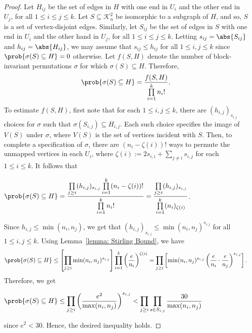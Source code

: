 \documentclass[12pt]{article}
\begin{document}
\begin{proof}
Let $H_{ij}$ be the set of edges in $H$ with one end in $U_i$ and the other end in $U_j$, for all $1\le i\le j\le k$.  Let $S\subseteq\mathcal{K}_n^2$ be isomorphic to a subgraph of $H$, and so, $S$ is a set of vertex-disjoint edges. Similarly, let $S_{ij}$ be the set of edges in $S$ with one end in $U_i$ and the other hand in $U_j$, for all $1\le i\le j\le k$. Letting $s_{ij} = \abs{S_{ij}}$ and $h_{ij} = \abs{H_{ij}}$, we may assume that $s_{ij}\leq h_{ij}$ for all $1\leq i,j\leq k$ since $\prob{\sigma(S)\subseteq H} = 0$ otherwise. Let $f(S,H)$ denote the number of block-invariant permutations $\sigma$ for which $\sigma(S)\subseteq H$. Therefore,\begin{equation}\label{eqn:Permutation Ratio for Stirling}
    \prob{\sigma(S)\subseteq H} = \displaystyle\frac{f(S,H)}{\prod\limits_{i = 1}^{k} n_i!}.
\end{equation}
To estimate $f(S,H)$, first note that for each $1\leq i,j\leq k$, there are $(h_{i,j})_{s_{i,j}}$ choices for $\sigma$ such that
$\sigma(S_{i,j})\subseteq H_{i,j}$.
Each such choice specifies the image of $V(S)$ under $\sigma$, where $V(S)$ is the set of vertices incident with $S$.
Then, to complete a specification of $\sigma$,
there are $(n_i - \zeta(i))!$ ways to permute the unmapped vertices in each $U_i$, where $\zeta(i):= 2s_{i,i} + \sum\limits_{j\neq i} s_{i,j}$ for each $1\leq i\leq k$. It follows that
\begin{center}
    $\prob{\sigma(S)\subseteq H} = \displaystyle\frac{\prod\limits_{j\geq i} (h_{i,j})_{s_{i,j}}\prod\limits_{i = 1}^{k} (n_i - \zeta(i))!}{\prod\limits_{i = 1}^{k} n_i!} = \frac{\prod\limits_{j\geq i} (h_{i,j})_{s_{i,j}}}{\prod\limits_{i = 1}^{k} (n_i)_{\zeta(i)}}$.
\end{center}


Since $h_{i,j}\leq\min(n_i,n_j)$, we get that $\left(h_{i,j}\right)_{s_{i,j}}\leq\min(n_i,n_j)^{s_{i,j}}$ for all $1\leq i,j\leq k$. Using Lemma~\ref{lemma: Stirling Bound}, we have
\[
    \prob{\sigma(S)\subseteq H}\leq\left[\prod\limits_{j\geq i} \min(n_i,n_j)^{s_{i,j}}\right]\prod\limits_{i = 1}^{k}  \left(\frac{e}{n_i}\right)^{\zeta(i)} = \prod\limits_{j\geq i} \left[\min(n_i,n_j)^{s_{i,j}}\left(\frac{e}{n_i}\cdot\frac{e}{n_j}\right)^{s_{i,j}}\right].
\]
Therefore, we get
\begin{center}
    $\prob{\sigma(S)\subseteq H}\leq\displaystyle\prod\limits_{j\geq i} \left(\frac{e^2}{\max(n_i,n_j)}\right)^{s_{i,j}} < \prod\limits_{j\geq i} \prod\limits_{s\in S_{i,j}} \frac{30}{\max(n_i,n_j)}$
\end{center}
since $e^2 < 30$. Hence, the desired inequality holds.
\end{proof}
\end{document}
